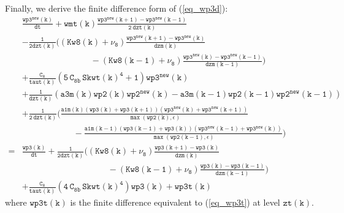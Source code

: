 \documentclass[11pt,fleqn]{article}
\begin{document}
%
Finally, we derive the finite difference form of (\ref{eq_wp3d}):
%
\begin{equation}
\label{eq_wp3e}
\begin{split}
& \mathtt{
  \frac{wp3^{new}(k)}{dt}
  + wmt(k) \frac{wp3^{new}(k+1)-wp3^{new}(k-1)}{2 \ dzt(k)}
  } \\
& \mathtt{
  - \frac{1}{2dzt(k)} 
    \bigg( 
            \left(Kw8(k)+\nu_8\right)
            \frac{wp3^{new}(k+1)-wp3^{new}(k)}{dzm(k)} }  \\
& \mathtt{ \qquad \qquad \qquad \qquad
          - \left(Kw8(k-1)+\nu_8\right)
            \frac{wp3^{new}(k)-wp3^{new}(k-1)}{dzm(k-1)}
    \bigg)
  } \\
& \mathtt{
+ \frac{C_8}{taut(k)}
   \left(  5 \, C_{8b} \, {Skwt(k)}^4 + 1 \right) wp3^{new}(k)
  } \\
& \mathtt{
  + \frac{1}{dzt(k)} 
    \left(a3m(k) wp2(k) wp2^{new}(k) - a3m(k-1) wp2(k-1) wp2^{new}(k-1) \right)
  } \\
& \mathtt{
  + \frac{1}{2 \, dzt(k)}
    \bigg(
      \frac{ a1m(k)
             \left(wp3(k)+wp3(k+1)\right)
             \left(wp3^{new}(k)+wp3^{new}(k+1)\right) }
           { \max\left( wp2(k), \epsilon \right) }
  } \\
& \mathtt{ \quad \quad \quad \quad \quad \quad
     -\frac{ a1m(k-1) 
             \left(wp3(k-1)+wp3(k)\right)
             \left(wp3^{new}(k-1)+wp3^{new}(k)\right) }
           { \max\left( wp2(k-1), \epsilon \right) }
    \bigg)
  } \\
=& \mathtt{
  \frac{wp3(k)}{dt} 
  + \frac{1}{2dzt(k)} 
    \bigg( 
            \left(Kw8(k)+\nu_8\right)
            \frac{wp3(k+1)-wp3(k)}{dzm(k)} }  \\
& \mathtt{ \qquad \qquad \qquad \qquad \qquad
          - \left(Kw8(k-1)+\nu_8\right)
            \frac{wp3(k)-wp3(k-1)}{dzm(k-1)}
    \bigg)
  } \\
& \mathtt{
+ \frac{C_8}{taut(k)}
   \left( 4 \, C_{8b} \, {Skwt(k)}^4 \right) wp3(k) + wp3t(k) }
\end{split}
\end{equation}
%
where $\mathtt{wp3t(k)}$ is the finite difference equivalent to (\ref{eq_wp3t}) 
at level $\mathtt{zt(k)}$.
%
\end{document}
